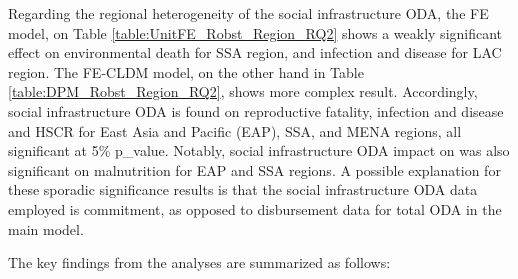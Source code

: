 Regarding the regional heterogeneity of the social infrastructure ODA, the FE model, on Table \ref{table:UnitFE_Robst_Region_RQ2} shows a weakly significant effect on environmental death for SSA region, and infection and disease for LAC region. The FE-CLDM model, on the other hand in Table \ref{table:DPM_Robst_Region_RQ2}, shows more complex result. Accordingly, social infrastructure ODA is found on reproductive fatality, infection and disease and HSCR for East Asia and Pacific (EAP), SSA, and MENA regions, all significant at 5\% p\_value. Notably, social infrastructure ODA impact on was also significant on malnutrition for EAP and SSA regions. A possible explanation for these sporadic significance results is that the social infrastructure ODA data employed is commitment, as opposed to disbursement data for total ODA in the main model. 


The key findings from the analyses are summarized as follows:

